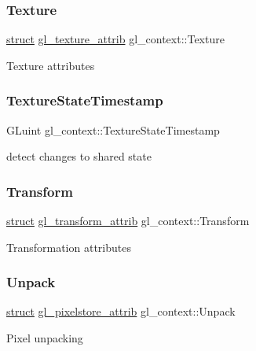 \subsubsection{\texorpdfstring{Texture}{Texture}}
{\footnotesize\ttfamily \hyperlink{interfacestruct}{struct} \hyperlink{structgl__texture__attrib}{gl\+\_\+texture\+\_\+attrib} gl\+\_\+context\+::\+Texture}

Texture attributes \mbox{\label{structgl__context_ac8146a34f7767c6158be080769804ef1}} 
\subsubsection{\texorpdfstring{Texture\+State\+Timestamp}{TextureStateTimestamp}}
{\footnotesize\ttfamily G\+Luint gl\+\_\+context\+::\+Texture\+State\+Timestamp}

detect changes to shared state \mbox{\label{structgl__context_a12d40ee4d766575386d7e25b03dd7db0}} 
\subsubsection{\texorpdfstring{Transform}{Transform}}
{\footnotesize\ttfamily \hyperlink{interfacestruct}{struct} \hyperlink{structgl__transform__attrib}{gl\+\_\+transform\+\_\+attrib} gl\+\_\+context\+::\+Transform}

Transformation attributes \mbox{\label{structgl__context_aa7be6bf26321340cd2fcb3857c2756b6}} 
\subsubsection{\texorpdfstring{Unpack}{Unpack}}
{\footnotesize\ttfamily \hyperlink{interfacestruct}{struct} \hyperlink{structgl__pixelstore__attrib}{gl\+\_\+pixelstore\+\_\+attrib} gl\+\_\+context\+::\+Unpack}

Pixel unpacking \mbox{\label{structgl__context_aa41cddcbdb50f005d485615064e0ab2a}} 
